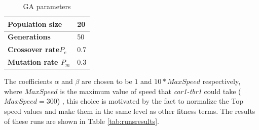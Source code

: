 \documentclass[conference]{IEEEtran}
\begin{document}
\begin{table}[!ht]	
		\centering
{\scriptsize
		\caption{GA parameters}
		\label{tab:GA_config}
		\begin{tabular}{|p{3.6cm}|p{3cm}|}
			\hline \textbf{Population size} & 20 \\
			\hline \textbf{Generations} & 50   \\
			\hline \textbf{Crossover rate$\textit{P}_{\textit{c}}$} &  0.7 \\
			\hline \textbf{Mutation rate $\textit{P}_{\textit{m}}$} &  0.3   \\ 		
			\hline          
		\end{tabular}	
}
\end{table}

The coefficients $\alpha$ and $\beta$ are chosen to be $1$  and
$10*MaxSpeed$ respectively, where $MaxSpeed $ is the maximum value of
speed that \textit{car1-tbr1}  could take ($MaxSpeed=300$)
\cite{evo17}, this choice is motivated by the fact to normalize
the Top speed values and make them in the same level as other fitness
terms. 
The results of these runs are shown in Table \ref{tab:runsresults}.
\end{document}
